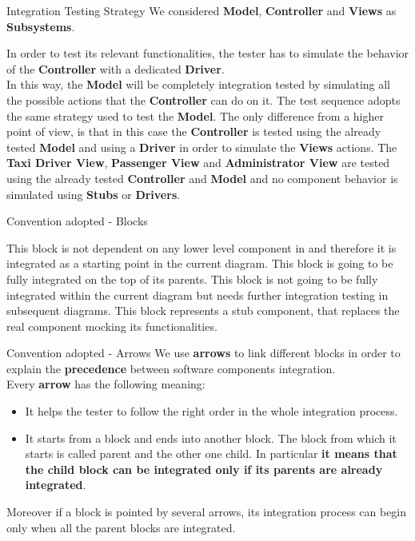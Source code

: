 \documentclass{../common/latex_classes/pdf_presentation}
\begin{document}
	\begin{frame}{Integration Testing Strategy}
		We considered \textbf{Model}, \textbf{Controller} and \textbf{Views} as \textbf{Subsystems}. \\
		\medskip
		\begin{itemize}
			 In order to test its relevant functionalities, the tester has to simulate the behavior of the \textbf{Controller} with a dedicated \textbf{Driver}. \\
			In this way, the \textbf{Model} will be completely integration tested by simulating all the possible actions that the \textbf{Controller} can do on it.
			 The test sequence adopts the same strategy used to test the \textbf{Model}. The only difference from a higher point of view, is that in this case the \textbf{Controller} is tested using the already tested \textbf{Model} and using a \textbf{Driver} in order to simulate the \textbf{Views} actions.
			 The \textbf{Taxi Driver View}, \textbf{Passenger View} and \textbf{Administrator View} are tested using the already tested \textbf{Controller} and \textbf{Model} and no component behavior is simulated using \textbf{Stubs} or \textbf{Drivers}.
		\end{itemize}
	\end{frame}
	\begin{frame}{Convention adopted - Blocks}
		\begin{itemize}
			 This block is not dependent on any lower level component in \myTaxiService{} and therefore it is integrated as a starting point in the current diagram.
			 This block is going to be fully integrated on the top of its parents.
			 This block is not going to be fully integrated within the current diagram but needs further integration testing in subsequent diagrams.
			 This block represents a stub component, that replaces the real component mocking its functionalities.
		\end{itemize}
	\end{frame}
	\begin{frame}{Convention adopted - Arrows}
		We use \textbf{arrows} to link different blocks in order to explain the \textbf{precedence} between software components integration. \\
		\medskip
		Every \textbf{arrow} has the following meaning:
		\begin{itemize}
			\item It helps the tester to follow the right order in the whole integration process.
			\item It starts from a block and ends into another block. The block from which it starts is called parent and the other one child. In particular \textbf{it means that the child block can be integrated only if its parents are already integrated}.
		\end{itemize}
		\medskip
		Moreover if a block is pointed by several arrows, its integration process can begin only when all the parent blocks are integrated.
	\end{frame}
\end{document}
